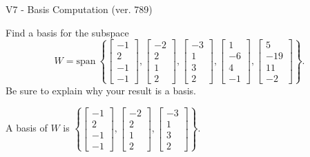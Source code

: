 \begin{exercise}
  \begin{exerciseTitle}V7 - Basis Computation (ver. 789)\end{exerciseTitle}
  \begin{exerciseStatement}
    Find a basis for the subspace 
\[W=\mathrm{span}\ \left\{\left[\begin{array}{r}
-1 \\
2 \\
-1 \\
-1
\end{array}\right] , \left[\begin{array}{r}
-2 \\
2 \\
1 \\
2
\end{array}\right] , \left[\begin{array}{r}
-3 \\
1 \\
3 \\
2
\end{array}\right] , \left[\begin{array}{r}
1 \\
-6 \\
4 \\
-1
\end{array}\right] , \left[\begin{array}{r}
5 \\
-19 \\
11 \\
-2
\end{array}\right]\right\}.\]
 Be sure to explain why your result is a basis.


  \end{exerciseStatement}
  \begin{exerciseAnswer}
   A basis of \(W\) is  \(\left\{\left[\begin{array}{r}
-1 \\
2 \\
-1 \\
-1
\end{array}\right] , \left[\begin{array}{r}
-2 \\
2 \\
1 \\
2
\end{array}\right] , \left[\begin{array}{r}
-3 \\
1 \\
3 \\
2
\end{array}\right]\right\}\).
  


  \end{exerciseAnswer}
\end{exercise}